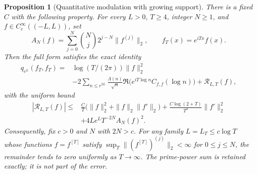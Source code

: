 \documentclass[11pt]{article}
\newtheorem{proposition}[theorem]{Proposition}
\theoremstyle{remark}\newtheorem{remark}[theorem]{Remark}
\begin{document}
\begin{proposition}[Quantitative modulation with growing support]
\label{prop:joint-modulation}
There is a fixed $C$ with the following property. For every $L>0$,
$T\ge4$, integer $N\ge1$, and $f\in C_c^\infty((-L,L))$, set
\[
 A_N(f)=\sum_{j=0}^N\binom Nj2^{j-N}\|f^{(j)}\|_2,
 \qquad f_T(x)=e^{iTx}f(x).
\]
Then the full form satisfies the exact identity
\[
 \begin{split}
 q_{e^L}(f_T,f_T)
  ={}&\log(T/(2\pi))\|f\|_2^2\\
    &-2\sum_{n\le e^{2L}}\frac{\Lambda(n)}{\sqrt n}
          \Re\bigl(e^{iT\log n}C_{f,f}(\log n)\bigr)
       +\mathcal R_{L,T}(f),
 \end{split}
\]
with the uniform bound
\[
 \begin{split}
 |\mathcal R_{L,T}(f)|\le{}&
 \frac C T\bigl(\|f\|_2^2+\|f\|_2\|f'\|_2\bigr)
 +\frac{C\log(2+T)}{T^2}\|f'\|_2^2\\
 &+4Le^LT^{-2N} A_N(f)^2 .
 \end{split}                                               \tag{JM}
\]
Consequently, fix $c>0$ and $N$ with $2N>c$. For any family
$L=L_T\le c\log T$ whose functions $f=f^{[T]}$ satisfy
$\sup_T\| (f^{[T]})^{(j)}\|_2<\infty$ for $0\le j\le N$,
the remainder tends to zero uniformly as $T\to\infty$.
The prime-power sum is retained exactly; it is not part of the error.
\end{proposition}
\end{document}

